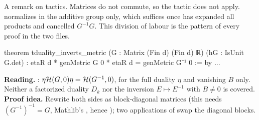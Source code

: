 \noindent A remark on tactics. Matrices do not commute, so the tactic  does not
apply.  normalizes in the additive group only, which suffices once
 has expanded all products and cancelled $G^{-1}G$. This division of
labour is the pattern of every proof in the two files.

\begin{leanbox}
\begin{leancode}
theorem tduality_inverts_metric (G : Matrix (Fin d) (Fin d) ℝ)
    (hG : IsUnit G.det) :
    etaR d * genMetric G 0 * etaR d = genMetric G⁻¹ 0 := by ...
\end{leancode}
\textbf{Reading.} : $\eta\mathcal{H}(G,0)\eta=\mathcal{H}(G^{-1},0)$, for the
full duality $\eta$ and vanishing $B$ only. Neither a factorized duality $D_k$ nor the
inversion $E\mapsto E^{-1}$ with $B\ne0$ is covered.
\textbf{Proof idea.} Rewrite both sides as block-diagonal matrices (this needs
$(G^{-1})^{-1}=G$, Mathlib's , hence );
two applications of  swap the diagonal blocks.
\end{leanbox}

